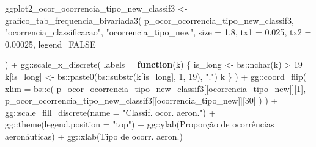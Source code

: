 \documentclass[
]{article}
\newenvironment{Shaded}{\begin{snugshade}}{\end{snugshade}}
\newcommand{\AttributeTok}[1]{\textcolor[rgb]{0.77,0.63,0.00}{#1}}
\newcommand{\ConstantTok}[1]{\textcolor[rgb]{0.00,0.00,0.00}{#1}}
\newcommand{\ControlFlowTok}[1]{\textcolor[rgb]{0.13,0.29,0.53}{\textbf{#1}}}
\newcommand{\DecValTok}[1]{\textcolor[rgb]{0.00,0.00,0.81}{#1}}
\newcommand{\FloatTok}[1]{\textcolor[rgb]{0.00,0.00,0.81}{#1}}
\newcommand{\FunctionTok}[1]{\textcolor[rgb]{0.00,0.00,0.00}{#1}}
\newcommand{\NormalTok}[1]{#1}
\newcommand{\OtherTok}[1]{\textcolor[rgb]{0.56,0.35,0.01}{#1}}
\newcommand{\SpecialCharTok}[1]{\textcolor[rgb]{0.00,0.00,0.00}{#1}}
\newcommand{\StringTok}[1]{\textcolor[rgb]{0.31,0.60,0.02}{#1}}
\begin{document}
\begin{Shaded}
\begin{Highlighting}[]
\NormalTok{ggplot2\_ocor\_ocorrencia\_tipo\_new\_classif3 }\OtherTok{\textless{}{-}} \FunctionTok{grafico\_tab\_frequencia\_bivariada3}\NormalTok{(}
\NormalTok{    p\_ocor\_ocorrencia\_tipo\_new\_classif3,}
    \StringTok{"ocorrencia\_classificacao"}\NormalTok{,}
    \StringTok{"ocorrencia\_tipo\_new"}\NormalTok{,}
    \AttributeTok{size =} \FloatTok{1.8}\NormalTok{,}
    \AttributeTok{tx1 =} \FloatTok{0.025}\NormalTok{,}
    \AttributeTok{tx2 =} \FloatTok{0.00025}\NormalTok{,}
    \AttributeTok{legend=}\ConstantTok{FALSE}
    
\NormalTok{) }\SpecialCharTok{+}\NormalTok{ gg}\SpecialCharTok{::}\FunctionTok{scale\_x\_discrete}\NormalTok{(}
    \AttributeTok{labels =} \ControlFlowTok{function}\NormalTok{(k) \{}
\NormalTok{        is\_long }\OtherTok{\textless{}{-}}\NormalTok{ bs}\SpecialCharTok{::}\FunctionTok{nchar}\NormalTok{(k) }\SpecialCharTok{\textgreater{}} \DecValTok{19}
\NormalTok{        k[is\_long] }\OtherTok{\textless{}{-}}\NormalTok{ bs}\SpecialCharTok{::}\FunctionTok{paste0}\NormalTok{(bs}\SpecialCharTok{::}\FunctionTok{substr}\NormalTok{(k[is\_long], }\DecValTok{1}\NormalTok{, }\DecValTok{19}\NormalTok{), }\StringTok{"."}\NormalTok{)}
\NormalTok{        k}
\NormalTok{    \}}
\NormalTok{) }\SpecialCharTok{+}
\NormalTok{    gg}\SpecialCharTok{::}\FunctionTok{coord\_flip}\NormalTok{(}
        \AttributeTok{xlim =}\NormalTok{ bs}\SpecialCharTok{::}\FunctionTok{c}\NormalTok{(}
\NormalTok{            p\_ocor\_ocorrencia\_tipo\_new\_classif3[[}\StringTok{\textquotesingle{}ocorrencia\_tipo\_new\textquotesingle{}}\NormalTok{]][}\DecValTok{1}\NormalTok{],}
\NormalTok{            p\_ocor\_ocorrencia\_tipo\_new\_classif3[[}\StringTok{\textquotesingle{}ocorrencia\_tipo\_new\textquotesingle{}}\NormalTok{]][}\DecValTok{30}\NormalTok{]}
\NormalTok{        )}
\NormalTok{    ) }\SpecialCharTok{+}
\NormalTok{    gg}\SpecialCharTok{::}\FunctionTok{scale\_fill\_discrete}\NormalTok{(}\AttributeTok{name =} \StringTok{"Classif. ocor. aeron."}\NormalTok{) }\SpecialCharTok{+}
\NormalTok{    gg}\SpecialCharTok{::}\FunctionTok{theme}\NormalTok{(}\AttributeTok{legend.position =} \StringTok{"top"}\NormalTok{) }\SpecialCharTok{+}
\NormalTok{    gg}\SpecialCharTok{::}\FunctionTok{ylab}\NormalTok{(}\StringTok{\textquotesingle{}Proporção de ocorrências aeronáuticas\textquotesingle{}}\NormalTok{) }\SpecialCharTok{+}
\NormalTok{    gg}\SpecialCharTok{::}\FunctionTok{xlab}\NormalTok{(}\StringTok{\textquotesingle{}Tipo de ocorr. aeron.\textquotesingle{}}\NormalTok{)}
\end{Highlighting}
\end{Shaded}
\end{document}
